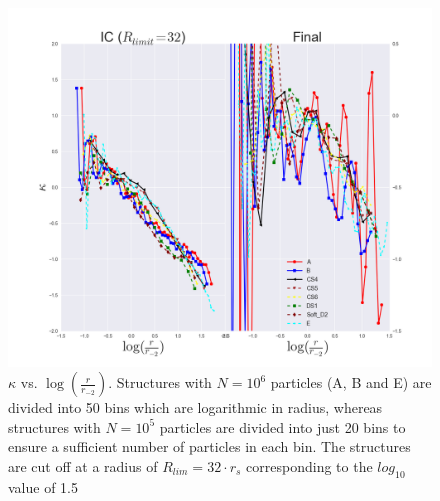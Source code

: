 \begin{figure}[!htbp]
\centering
\includegraphics[width=1.0\linewidth]{img/Fig_logr_r2_kappa_ABCS4CS5CS6DS1D2E_IC_Final_R_limit_32.png}
\caption{$\kappa$ vs. $\log (\frac{r}{r_{-2}})$. Structures with $N = 10^6$ particles (A, B and E) are divided into 50 bins which are logarithmic in radius, whereas structures with $N = 10^5$ particles are divided into just 20 bins to ensure a sufficient number of particles in each bin. The structures are cut off at a radius of $R_{lim} = 32\cdot r_s$ corresponding to the $log_{10}$ value of 1.5}
\label{fig:test}
\end{figure}






